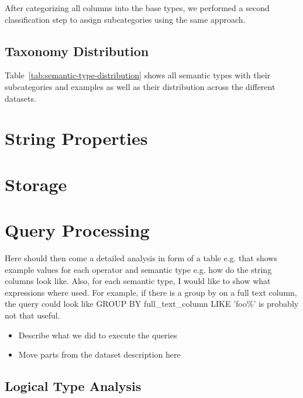 After categorizing all columns into the base types, we performed a second classification step to assign subcategories using the same approach.
\subsection{Taxonomy Distribution}\label{sec:semantic-type-results}
Table~\ref{tab:semantic-type-distribution} shows all semantic types with their subcategories and examples as well as
their distribution across the different datasets.
\begin{table}[t!]
    
    \caption{Distribution of semantic types across different datasets.}
    \label{tab:semantic-type-distribution}
\end{table}


\section{String Properties}\label{sec:string-properties}


\section{Storage}\label{sec:storage}



\section{Query Processing}\label{sec:query-processing}
Here should then come a detailed analysis in form of a table e.g. that shows example values for each operator and semantic
type e.g. how do the string columns look like. Also, for each semantic type, I would like to show what expressions where used.
For example, if there is a group by on a full text column, the query could look like
GROUP BY full\_text\_column LIKE 'foo\%' is probably not that useful.
\begin{itemize}
    \item Describe what we did to execute the queries
    \item Move parts from the dataset description here
\end{itemize}

\subsection{Logical Type Analysis}\label{subsec:logical-type-analysis}


